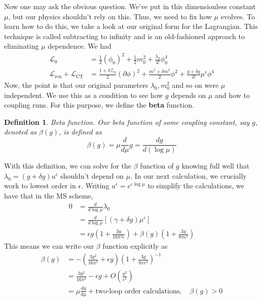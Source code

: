 \documentclass[11pt, oneside]{article}   	%
\theoremstyle{slanted}
\newtheorem*{defn}{Definition}
\begin{document}
Now one may ask the 
obvious question. We've put in 
this dimensionless constant $ \mu $, 
but our physics shouldn't 
rely on this. Thus, we need to 
fix how $\mu $  evolves. To learn how to 
do this, we take a look at our original 
form for the Lagrangian. This technique 
is called subtracting to infinity and is an 
old-fashioned approach to eliminating $ \mu $ 
dependence. 
We had 
\begin{align*}
\mathcal{ L } _ 0 &=  
\frac{1}{2 } \left( \phi _ 0  \right)  ^ 2 + \frac{1}{2  } m_0 ^ 2
+ \frac{\lambda _ 0 }{ 4 ! } \phi _ 0 ^ 4 \\
\mathcal{ L } _{\text{ren}} + \mathcal{ L } _{\text{CT}} &=
\frac{1+   \delta \mathcal{ Z } _{ \phi } }{ 2 } \left( 
\partial  \phi \right)  ^ 2 + \frac{m ^ 2 + \delta m ^ 2 }{ 2 } \phi ^ 2 
+ \frac{g + \delta g  }{ 4 !  } \mu ^{ \epsilon } \phi ^ 4 
\end{align*}
Now, the point is that our original 
parameters $ \lambda _ 0 , m_0 ^ 2 $  and so on
were  $ \mu $ independent. We use this 
as a condition to see how 
$ g $ depends on $ \mu $ and how to coupling runs. For
this purpose, we define the \textbf{beta} function.
\begin{defn}{Beta function.}
Our beta function of some coupling constant, say 
$ g $, denoted as $ \beta \left( g  \right)  $, is 
defined as 
\[
\beta \left( g  \right) 
= \mu \frac{d  }{ d \mu } g  = \frac{d g }{ d \left( \log \mu  \right)  } 
\] 
\end{defn}
With this definition, we can solve 
for the $ \beta $ function of $ g $ knowing 
full well that $ \lambda _ 0  = 
\left( g + \delta g  \right)  u ^{ \epsilon } $  shouldn't 
depend on $ \mu $. In our next calculation, we 
crucially work to lowest order in 
$ \epsilon $. Writing $ u ^{ \epsilon  } = e 
^{ \epsilon \log \mu } $ to simplify the calculations, we 
have that in the MS scheme,  
\begin{align*}
0 &=  \frac{d }{ d \log \mu } \lambda _ 0  \\
  &=  \frac{d }{ d\log \mu } \left[  \left( 
  \gamma + \delta g \right)  \mu ^{ \epsilon }  \right]   \\
  &=  \epsilon g \left(  1 + \frac{ 3g }{ 16 \pi ^ 2 \epsilon }  \right)  
  + \beta \left( g  \right)  \left(  1 + \frac{ 3g }{ 8 \pi \epsilon ^ 2 }  \right)  
\end{align*}
This means we can write our $ \beta $ function 
explicitly as 
\begin{align*}
\beta \left( g  \right)  &=  - \left( \frac{3 g ^ 2 }{ 16 \pi ^ 2 } 
+ \epsilon g \right)  \left( 1 + \frac{3g }{ 8 \pi \epsilon ^ 2 }   \right) 
^{ - 1 } \\ 
			 &=  \frac{3g ^ 2 }{ 16 \pi ^ 2 }  - \epsilon g + O \left( 
			 \frac{g ^ 2 }{ \epsilon ^ 2 } \right)  \\
			 &=  \mu \frac{ dg }{ d \mu } + \text{two-loop order 
			 calculations}, \quad \beta \left( g  \right)  > 0 
\end{align*}
\end{document}
